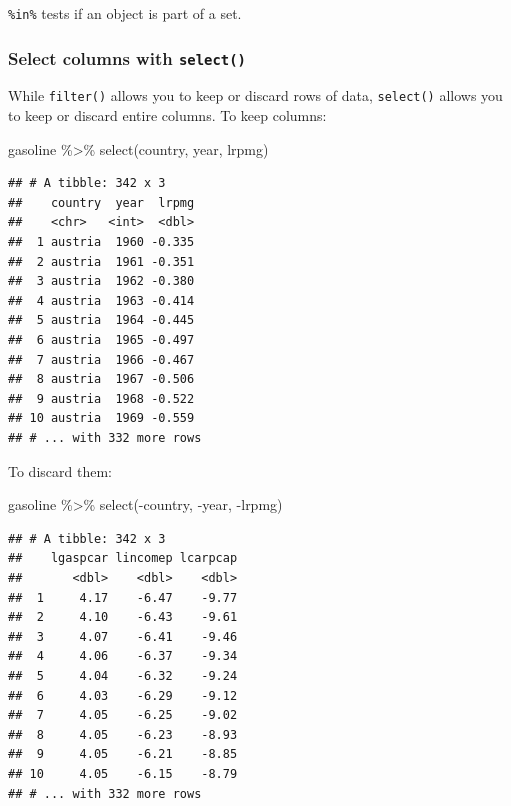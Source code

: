\documentclass[
]{article}
\newenvironment{Shaded}{\begin{snugshade}}{\end{snugshade}}
\newcommand{\FunctionTok}[1]{\textcolor[rgb]{0.00,0.00,0.00}{#1}}
\newcommand{\NormalTok}[1]{#1}
\newcommand{\SpecialCharTok}[1]{\textcolor[rgb]{0.00,0.00,0.00}{#1}}
\begin{document}
\texttt{\%in\%} tests if an object is part of a set.

\hypertarget{select-columns-with-select}{%
\subsubsection{\texorpdfstring{Select columns with \texttt{select()}}{Select columns with select()}}\label{select-columns-with-select}}

While \texttt{filter()} allows you to keep or discard rows of data, \texttt{select()} allows you to keep or
discard entire columns. To keep columns:

\begin{Shaded}
\begin{Highlighting}[]
\NormalTok{gasoline }\SpecialCharTok{\%\textgreater{}\%}
  \FunctionTok{select}\NormalTok{(country, year, lrpmg)}
\end{Highlighting}
\end{Shaded}

\begin{verbatim}
## # A tibble: 342 x 3
##    country  year  lrpmg
##    <chr>   <int>  <dbl>
##  1 austria  1960 -0.335
##  2 austria  1961 -0.351
##  3 austria  1962 -0.380
##  4 austria  1963 -0.414
##  5 austria  1964 -0.445
##  6 austria  1965 -0.497
##  7 austria  1966 -0.467
##  8 austria  1967 -0.506
##  9 austria  1968 -0.522
## 10 austria  1969 -0.559
## # ... with 332 more rows
\end{verbatim}

To discard them:

\begin{Shaded}
\begin{Highlighting}[]
\NormalTok{gasoline }\SpecialCharTok{\%\textgreater{}\%}
  \FunctionTok{select}\NormalTok{(}\SpecialCharTok{{-}}\NormalTok{country, }\SpecialCharTok{{-}}\NormalTok{year, }\SpecialCharTok{{-}}\NormalTok{lrpmg)}
\end{Highlighting}
\end{Shaded}

\begin{verbatim}
## # A tibble: 342 x 3
##    lgaspcar lincomep lcarpcap
##       <dbl>    <dbl>    <dbl>
##  1     4.17    -6.47    -9.77
##  2     4.10    -6.43    -9.61
##  3     4.07    -6.41    -9.46
##  4     4.06    -6.37    -9.34
##  5     4.04    -6.32    -9.24
##  6     4.03    -6.29    -9.12
##  7     4.05    -6.25    -9.02
##  8     4.05    -6.23    -8.93
##  9     4.05    -6.21    -8.85
## 10     4.05    -6.15    -8.79
## # ... with 332 more rows
\end{verbatim}
\end{document}
